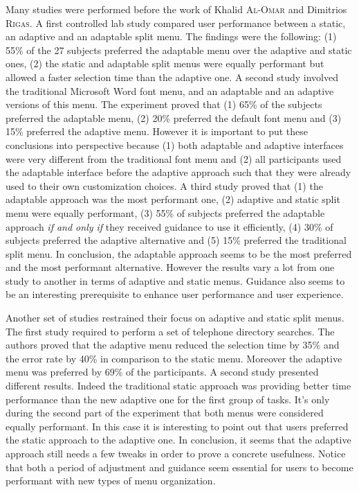 \begin{figure}[!ht]
    
    \label{fig:adapt_organizations}
\end{figure}

Many studies were performed before the work of Khalid \textsc{Al-Omar} and 
Dimitrios 
\textsc{Rigas}. A first controlled lab study compared user performance between a 
static, 
an adaptive and an adaptable split menu. The 
findings were the following: (1) 55\% of the 27 subjects preferred the 
adaptable menu over the adaptive and static ones, (2) the static and adaptable 
split menus were equally performant but allowed a faster selection time than 
the 
adaptive one. A second study involved the traditional Microsoft Word font menu, 
and an adaptable and an adaptive versions of this menu. The experiment proved 
that (1) 65\% of the subjects preferred the adaptable menu, (2) 20\% preferred 
the default font menu and (3) 15\% preferred the adaptive menu. However it is 
important to put these conclusions into perspective because (1) both adaptable 
and adaptive interfaces were very different from the traditional font menu and 
(2) all participants used the adaptable interface before the adaptive approach 
such that they were already used to their own customization choices. A third 
study proved that (1) the adaptable approach was the most performant one, (2) 
adaptive and static split menu were equally performant, (3) 55\% of subjects 
preferred the adaptable approach \textit{if and only if} they received guidance 
to use it efficiently, (4) 30\% of subjects preferred the adaptive alternative 
and (5) 15\% preferred the traditional split menu. In conclusion, the adaptable 
approach seems to be the most preferred and the most performant alternative. 
However the results vary a lot from one study to another in terms of adaptive 
and static menus. Guidance also seems to be an interesting prerequisite to 
enhance user performance and user experience.\newline

Another set of studies restrained their focus on adaptive and static split 
menus. The first study required to perform a set of telephone directory 
searches. The authors proved that the adaptive menu reduced the selection time 
by 35\% and the error rate by 40\% in comparison to the static menu. Moreover 
the adaptive menu was preferred by 69\% of the participants. A second study 
presented different results. Indeed the traditional static approach was 
providing better time performance than the new adaptive one for the first group 
of tasks. It’s only during the second part of the experiment that both menus 
were considered equally performant. In this case it is interesting to point out 
that users preferred the static approach to the adaptive one. In conclusion, it 
seems that the adaptive approach still needs a few tweaks in order to prove a 
concrete usefulness. Notice that both a period of adjustment and guidance 
seem essential for users to become performant with new types of menu 
organization.\newline

